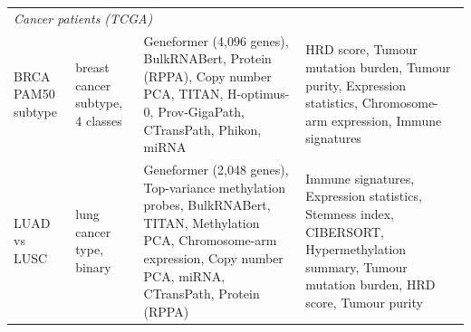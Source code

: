 \begin{longtable}{p{2.8cm}p{2.8cm}p{5.4cm}p{3.4cm}}
\midrule
\multicolumn{4}{l}{\textit{Cancer patients (TCGA)}} \\
BRCA PAM50 subtype \citep{TCGA2012BRCA} & breast cancer subtype, 4 classes & Geneformer (4,096 genes), BulkRNABert, Protein (RPPA), Copy number PCA, TITAN, H-optimus-0, Prov-GigaPath, CTransPath, Phikon, miRNA & HRD score, Tumour mutation burden, Tumour purity, Expression statistics, Chromosome-arm expression, Immune signatures \\
LUAD vs LUSC \citep{TCGA2014LUAD} & lung cancer type, binary & Geneformer (2,048 genes), Top-variance methylation probes, BulkRNABert, TITAN, Methylation PCA, Chromosome-arm expression, Copy number PCA, miRNA, CTransPath, Protein (RPPA) & Immune signatures, Expression statistics, Stemness index, CIBERSORT, Hypermethylation summary, Tumour mutation burden, HRD score, Tumour purity \\
\end{longtable}

